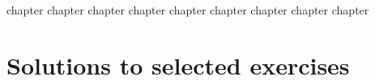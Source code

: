{chapter}
{chapter}
{chapter}
{chapter}
{chapter}
{chapter}
{chapter}
{chapter}
{chapter}


\chapter{Solutions to selected exercises}
\printsolutions
